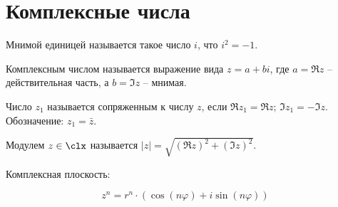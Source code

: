 \documentclass[12pt]{article}
\begin{document}
    \section{Комплексные числа}
    \begin{definition}
        Мнимой единицей называется такое число $i$, что $i^2=-1$.
    \end{definition}
    \begin{definition}
        Комплексным числом называется выражение вида $z=a+bi$, где $a=\Re z$ – действительная часть, а $b=\Im z$ – мнимая.
    \end{definition}
    \begin{definition}
        Число $z_1$ называется сопряженным к числу $z$, если $\Re z_1=\Re z;\,\Im z_1=-\Im z$. Обозначение: $z_1=\bar{z}$.
    \end{definition}
    \begin{definition}
        Модулем $z\in \clx$ называется $|z|=\sqrt{(\Re z)^2+(\Im z)^2}$.
    \end{definition}
    \begin{definition}
        Комплексная плоскость:
        \begin{center}
        \end{center}
    \end{definition}
    \begin{theorem}
        $$z^n=r^n\cdot(\cos(n\varphi)+i\sin(n\varphi))$$
    \end{theorem}
\end{document}
